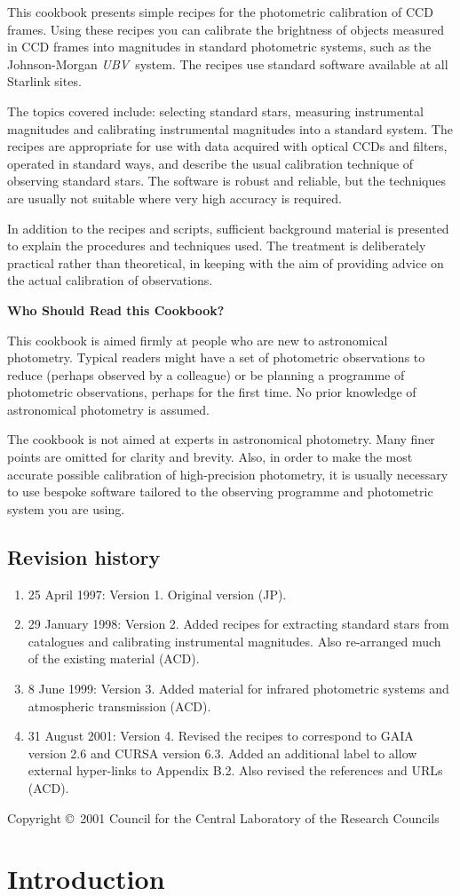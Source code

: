 \documentclass[twoside,11pt]{article}
\newcommand{\stardocinitials}  {SC}
\newcommand{\stardoccopyright} {Copyright \copyright\ 2001 Council for the
Central Laboratory of the Research Councils}
\newcommand{\stardocnumber}    {6.4}
\newcommand{\stardocabstract}
{This cookbook presents simple recipes for the photometric calibration
of CCD frames.  Using these recipes you can calibrate the brightness
of objects measured in CCD frames into magnitudes in standard
photometric systems, such as the Johnson-Morgan {\it UBV}\, system.
The recipes use standard software available at all Starlink sites.

The topics covered include: selecting standard stars, measuring
instrumental magnitudes and calibrating instrumental magnitudes into a
standard system.  The recipes are appropriate for use with data acquired
with optical CCDs and filters, operated in standard ways, and describe the
usual calibration technique of observing standard stars.  The software
is robust and reliable, but the techniques are usually not suitable where
very high accuracy is required.

In addition to the recipes and scripts, sufficient background material
is presented to explain the procedures and techniques used.  The
treatment is deliberately practical rather than theoretical, in keeping
with the aim of providing advice on the actual calibration of observations.

\begin{latex}
\vspace{5mm}
\end{latex}

\begin{center}
{\bf Who Should Read this Cookbook?}
\end{center}

This cookbook is aimed firmly at people who are new to astronomical
photometry.  Typical readers might have a set of photometric observations
to reduce (perhaps observed by a colleague) or be planning a programme of
photometric observations, perhaps for the first time.  No prior knowledge
of astronomical photometry is assumed.

The cookbook is not aimed at experts in astronomical photometry.  Many
finer points are omitted for clarity and brevity.  Also, in order to
make the most accurate possible calibration of high-precision photometry,
it is usually necessary to use bespoke software tailored to the
observing programme and photometric system you are using.}
\newcommand{\stardocname}{\stardocinitials /\stardocnumber}
\newcommand{\xlabel}[1]{}
\newcommand{\latexonlytoc}[0]{\tableofcontents}
\renewcommand{\thepage}{\roman{page}}
\begin{document}
\stardocabstract
 \newpage

 \subsection*{Revision history}

 \begin{enumerate}

   \item 25 April 1997: Version 1. Original version (JP).

   \item 29 January 1998: Version 2.  Added recipes for extracting
    standard stars from catalogues and calibrating instrumental
    magnitudes.  Also re-arranged much of the existing material (ACD).

   \item 8 June 1999: Version 3.  Added material for infrared
    photometric systems and atmospheric transmission (ACD).

   \item 31 August 2001: Version 4.  Revised the recipes to correspond to
    GAIA version 2.6 and CURSA version 6.3.  Added an additional label to
    allow external hyper-links to Appendix B.2.  Also revised the references
    and URLs (ACD).

 \end{enumerate}

 \vspace*{\fill}
 \stardoccopyright

 \cleardoublepage
 \begin{latex}
   \setlength{\parskip}{0mm}
   \latexonlytoc

   \newpage
   \listoffigures
   \listoftables

   \setlength{\parskip}{\medskipamount}
   \markboth{\stardocname}{\stardocname}
 \end{latex}
\cleardoublepage
\newpage
\renewcommand{\thepage}{\arabic{page}}
\setcounter{page}{1}

\section{\xlabel{INTRO}\label{INTRO}Introduction}
\end{document}
